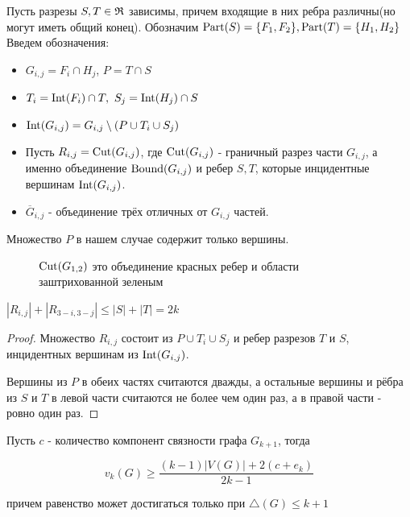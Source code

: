 \begin{prop*}
	Пусть разрезы $S, T \in \mathfrak{R}$ зависимы, причем входящие в них ребра различны(но могут иметь общий конец).
	Обозначим $\operatorname{Part}(S) = \{F_1, F_2\}, \operatorname{Part}(T) = \{H_1, H_2\}$
	Введем обозначения:

	\begin{itemize}
		\item $G_{i,j} = F_i \cap H_j$, $P = T \cap S$
		\item  $T_i = \operatorname{Int}(F_i) \cap T, \ S_j = \operatorname{Int}(H_j) \cap S$
		\item $\operatorname{Int}(G_{i, j}) = G_{i, j} \setminus (P \cup T_i \cup S_j)$
		\item Пусть  $R_{i, j} = \operatorname{Cut}(G_{i, j})$, где $\operatorname{Cut}(G_{i, j})$ - граничный разрез части  $G_{i, j}$, а именно объединение  $\operatorname{Bound}(G_{i, j})$ и ребер  $S, T$, которые инцидентные вершинам  $\operatorname{Int}(G_{i, j})$.
		\item $\overline G_{i, j}$ - объединение трёх отличных от  $G_{i, j}$ частей.
	\end{itemize}

	Множество $P$ в нашем случае содержит только вершины.

\end{prop*}

\begin{figure}[ht]
    \centering
	\caption{$\operatorname{Cut}(G_{1, 2})$ это объединение красных ребер и области заштрихованной зеленым}
    \label{fig:prop_dependent_cuts_k_connected_graph}
\end{figure}

\begin{customlm}{3.2} \label{lemma:3_2}
	$|R_{i, j}| + |R_{3 - i, 3 - j}| \leqslant |S| + |T| = 2k$
\end{customlm}

\begin{proof}
	Множество $R_{i, j}$ состоит из  $P \cup T_i \cup S_j$ и ребер разрезов  $T$ и  $S$, инцидентных вершинам из  $\operatorname{Int}(G_{i, j})$.

	Вершины из $P$ в обеих частях считаются дважды, а остальные вершины и рёбра из  $S$ и  $T$ в левой части считаются не более чем один раз, а в правой части - ровно один раз.
\end{proof}

\begin{customlm}{3.3} \label{lemma:3_3}
	Пусть $c$ - количество компонент связности графа  $G_{k + 1}$, тогда

	\[
		v_k(G) \geqslant \frac{(k - 1)|V(G)| + 2(c + e_k)}{2k - 1}
	\] 

	причем равенство может достигаться только при $\triangle (G) \leqslant k + 1$

\end{customlm}

